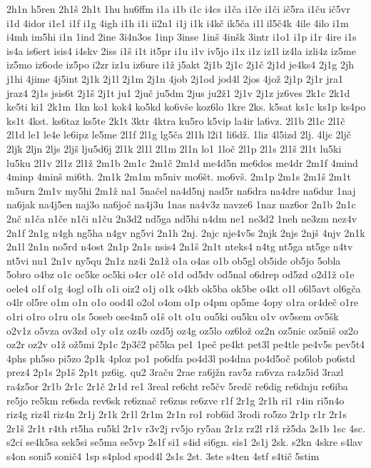 {2h1n
h5ren
2h1š
2h1t
1hu
hu6ffm
i1a
i1b
i1c
i4cs
i1ča
i1če
i1či
ič5ra
i1ču
ič5vr
i1d
4idor
i1e1
i1f
i1g
4igh
i1h
i1i
ii2n1
i1j
i1k
i4kč
ik5ča
i1l
il5č4k
4ile
4ilo
i1m
i4mh
im5hi
i1n
1ind
2ine
3i4n3os
1inp
3inse
1inš
4inšk
3intr
i1o1
i1p
i1r
4ire
i1s
is4a
is6ert
isis4
i4skv
2iss
i1š
i1t
it5pr
i1u
i1v
iv5jo
i1x
i1z
iz1l
iz4la
izli4z
iz5me
iz5mo
iz6ode
iz5po
i2zr
iz1u
iz6ure
i1ž
j5akt
2j1b
2j1c
2j1č
2j1d
je4ks4
2j1g
2jh
j1hi
4jime
4j5int
2j1k
2j1l
2j1m
2j1n
4job
2j1od
jod4l
2jos
4jož
2j1p
2j1r
jra1
jraz4
2j1s
jsis6t
2j1š
2j1t
ju1
2juč
ju5dm
2jus
ju2ž1
2j1v
2j1z
jz6ves
2k1c
2k1d
ke5ti
ki1
2k1m
1kn
ko1
kok4
ko5kd
ko6vše
koz6lo
1kre
2ks.
k5sat
ks1c
ks1p
ks4po
ks1t
4kst.
ks6taz
ks5te
2k1t
3ktr
4ktra
ku5ro
k5vip
la4ir
la6vz.
2l1b
2l1c
2l1č
2l1d
le1
le4e
le6ipz
le5me
2l1f
2l1g
lg5ča
2l1h
l2i1
li6dž.
1liz
4l5izd
2lj.
4ljc
2ljč
2ljk
2ljn
2ljs
2ljš
lju5d6j
2l1k
2l1l
2l1m
2l1n
lo1
1loč
2l1p
2l1s
2l1š
2l1t
lu5ki
lu5ku
2l1v
2l1z
2l1ž
2m1b
2m1c
2m1č
2m1d
me4d5n
me6dos
me4dr
2m1f
4mind
4minp
4minš
mi6th.
2m1k
2m1m
m5niv
mo6št.
mo6vš.
2m1p
2m1s
2m1š
2m1t
m5urn
2m1v
my5hi
2m1ž
na1
5načel
na4d5nj
nad5r
na6dra
na4dre
na6dur
1naj
na6jak
na4j5en
naj3o
na6joč
na4j3u
1nas
na4v3z
navze6
1naz
naz6or
2n1b
2n1c
2nč
n1ča
n1če
n1či
n1ču
2n3d2
nd5ga
nd5hi
n4dm
ne1
ne3d2
1neh
ne3zm
nez4v
2n1f
2n1g
n4gh
ng5ha
n4gv
ng5vi
2n1h
2nj.
2njc
nje4v5s
2njk
2njs
2njš
4njv
2n1k
2n1l
2n1n
no5rd
n4ost
2n1p
2n1s
nsis4
2n1š
2n1t
nteks4
n4tg
nt5ga
nt5ge
n4tv
nt5vi
nu1
2n1v
ny5qu
2n1z
nz4i
2n1ž
o1a
o4as
o1b
ob5gl
ob5ide
ob5jo
5obla
5obro
o4bz
o1c
oc5ke
oc5ki
o4cr
o1č
o1d
od5dv
od5nal
o6drep
od5zd
o2d1ž
o1e
oele4
o1f
o1g
4ogl
o1h
o1i
oiz2
o1j
o1k
o4kb
ok5ba
ok5be
o4kt
o1l
o6l5avt
ol6gča
o4lr
ol5re
o1m
o1n
o1o
ood4l
o2ol
o4om
o1p
o4pm
op5me
4opy
o1ra
or4deč
o1re
o1ri
o1ro
o1ru
o1s
5oseb
ose4m5
o1š
o1t
o1u
ou5ki
ou5ku
o1v
ov5sem
ov5šk
o2v1z
o5vza
ov3zd
o1y
o1z
oz4b
ozd5j
oz4g
oz5lo
oz6lož
oz2n
oz5nic
oz5niš
oz2o
oz2r
oz2v
o1ž
ož5mi
2p1c
2p3č2
pč5ka
pe1
1peč
pe4kt
pet3l
pe4tle
pe4v5s
pev5t4
4phs
ph5so
pi5zo
2p1k
4ploz
po1
po6dfa
po4d3l
po4dna
po4d5oč
po6lob
po6std
prez4
2p1s
2p1š
2p1t
pz6ig.
qu2
3raču
2rae
ra6jžn
rav5z
ra6vza
ra4z5id
3razl
ra4z5or
2r1b
2r1c
2r1č
2r1d
re1
3real
re6cht
re5čv
5redč
re6dig
re6dnju
re6iba
re5jo
re5km
re6sda
rev6sk
re6znač
re6zus
re6zve
r1f
2r1g
2r1h
ri1
r4in
ri5n4o
riz4g
riz4l
riz4n
2r1j
2r1k
2r1l
2r1m
2r1n
ro1
rob6id
3rodi
ro5zo
2r1p
r1r
2r1s
2r1š
2r1t
r4th
rt5ha
ru5kl
2r1v
r3v2j
rv5jo
ry5an
2r1z
rz2l
r1ž
rž5da
2s1b
1sc
4sc.
s2ci
se4k5sa
sek5si
se5ma
se5vp
2s1f
si1
s4id
si6gn.
sis1
2s1j
2sk.
s2kn
4skre
s4lav
s4on
soni5
sonič4
1sp
s4plod
spod4l
2s1s
2st.
3ste
s4ten
4stf
s4tič
5stim
}

